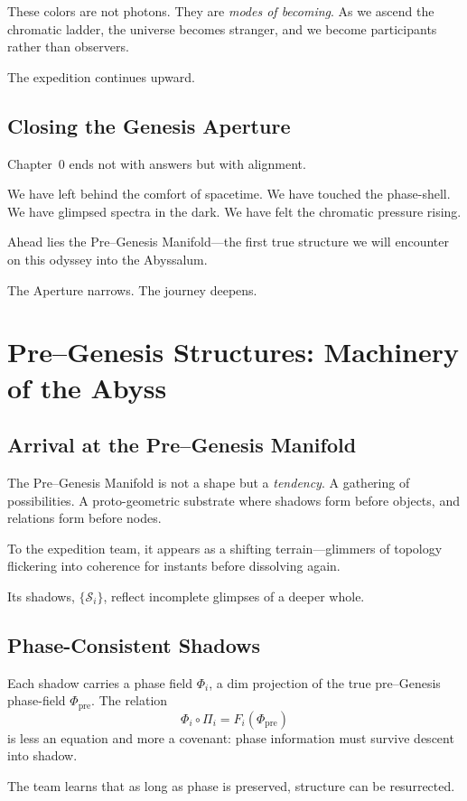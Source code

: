 These colors are not photons. They are \emph{modes of becoming}.
As we ascend the chromatic ladder, the universe becomes stranger,
and we become participants rather than observers.

The expedition continues upward.

\section{Closing the Genesis Aperture}
Chapter~0 ends not with answers but with alignment.

We have left behind the comfort of spacetime.
We have touched the phase-shell.
We have glimpsed spectra in the dark.
We have felt the chromatic pressure rising.

Ahead lies the Pre–Genesis Manifold—the first true structure we will encounter
on this odyssey into the Abyssalum.

The Aperture narrows.
The journey deepens.

\chapter{Pre–Genesis Structures: Machinery of the Abyss}
\label{ch:pre-genesis}

\section{Arrival at the Pre–Genesis Manifold}
The Pre–Genesis Manifold is not a shape but a \emph{tendency}. A gathering of possibilities.
A proto-geometric substrate where shadows form before objects, and relations form before nodes.

To the expedition team, it appears as a shifting terrain—glimmers of topology flickering into coherence
for instants before dissolving again.

Its shadows, $\{\mathcal{S}_i\}$, reflect incomplete glimpses of a deeper whole.

\section{Phase-Consistent Shadows}
Each shadow carries a phase field $\Phi_i$, a dim projection of the true pre–Genesis phase-field
$\Phi_{\mathrm{pre}}$. The relation
\[
\Phi_i \circ \Pi_i = F_i(\Phi_{\mathrm{pre}})
\]
is less an equation and more a covenant: phase information must survive descent into shadow.

The team learns that as long as phase is preserved, structure can be resurrected.

